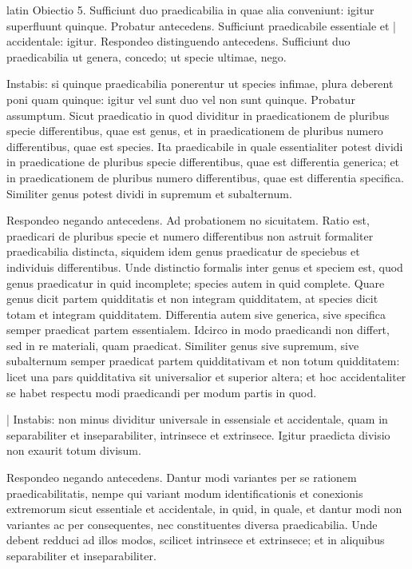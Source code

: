 \begin{otherlanguage*}{latin}
\pstart
Obiectio 5. Sufficiunt duo praedicabilia in quae alia conveniunt:
igitur superfluunt quinque. Probatur antecedens. Sufficiunt praedicabile essentiale et \textnormal{|} accidentale:
igitur. Respondeo distinguendo antecedens. Sufficiunt duo praedicabilia ut genera, concedo; ut specie ultimae, nego. 
\pend

\pstart
Instabis:
si quinque praedicabilia ponerentur ut species infimae, plura deberent poni quam quinque:
igitur vel sunt duo vel non sunt quinque. Probatur assumptum. Sicut praedicatio in quod dividitur in praedicationem de pluribus specie differentibus, quae est genus, et in praedicationem de pluribus numero differentibus, quae est species. Ita praedicabile in quale essentialiter potest dividi in praedicatione de pluribus specie differentibus, quae est differentia generica; et in praedicationem de pluribus numero differentibus, quae est differentia specifica. Similiter genus potest dividi in supremum et subalternum. 
\pend

\pstart
Respondeo negando antecedens. Ad probationem no sicuitatem. Ratio est, praedicari de pluribus specie et numero differentibus non astruit formaliter praedicabilia distincta, siquidem idem genus praedicatur de speciebus et individuis differentibus. Unde distinctio formalis inter genus et speciem est, quod genus praedicatur in quid incomplete; species autem in quid complete. Quare genus dicit partem quidditatis et non integram quidditatem, at species dicit totam et integram quidditatem. Differentia autem sive generica, sive specifica semper praedicat partem essentialem. Idcirco in modo praedicandi non differt, sed in re materiali, quam praedicat. Similiter genus sive supremum, sive subalternum semper praedicat partem quidditativam et non totum quidditatem:
licet una pars quidditativa sit universalior et superior altera; et hoc accidentaliter se habet respectu modi praedicandi per modum partis in quod. 
\pend

\pstart
\textnormal{|} Instabis:
non minus dividitur universale in essensiale et accidentale, quam in separabiliter et inseparabiliter, intrinsece et extrinsece. Igitur praedicta divisio non exaurit totum divisum. 
\pend

\pstart
Respondeo negando antecedens. Dantur modi variantes per se rationem praedicabilitatis, nempe qui variant modum identificationis et conexionis extremorum sicut essentiale et accidentale, in quid, in quale, et dantur modi non variantes ac per consequentes, nec constituentes diversa praedicabilia. Unde debent redduci ad illos modos, scilicet intrinsece et extrinsece; et in aliquibus separabiliter et inseparabiliter. 
\pend


\end{otherlanguage*}
